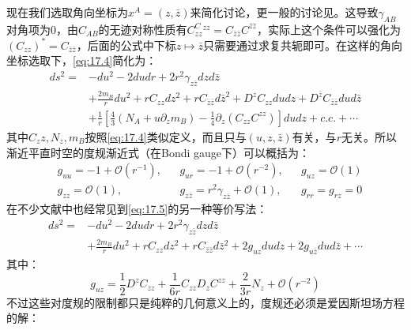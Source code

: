 现在我们选取角向坐标为$x^A=(z,\bar z)$来简化讨论，更一般的讨论见\cite{Compere:2019qed}。这导致$\gamma_{AB}$对角项为0，由$C_{AB}$的无迹对称性质有$C_{zz}^C^{zz}=C_{\bar z\bar z}C^{\bar z\bar z}$，实际上这个条件可以强化为$(C_{zz})^*=C_{\bar z\bar z}$，后面的公式中下标$z\mapsto \bar z$只需要通过求复共轭即可。在这样的角向坐标选取下，\ref{eq:17.4}简化为：
\begin{equation}\label{eq:17.5}
	\begin{aligned}
		ds^2=&-du^2-2dudr+2r^2\gamma_{z\bar z}dzd{\bar z}\\
		&+\frac{2m_B}{r}du^2+rC_{zz}dz^2+rC_{\bar z\bar z}d{\bar z}^2+D^z C_{zz}dudz+D^{\bar z}C_{\bar z\bar z}dud\bar z\\
		&+\frac{1}{r}\left[\frac{4}{3}\left(N_A+u\partial_zm_B\right)-\frac{1}{4}\partial_z\left(C_{zz}C^{zz}\right)\right]dudz+c.c.+\cdots
	\end{aligned}
\end{equation}
其中$C_zz,N_z,m_B$按照\ref{eq:17.4}类似定义，而且只与$(u,z,\bar z)$有关，与$r$无关。所以渐近平直时空的度规渐近式（在Bondi gauge下）可以概括为：
\begin{align*}
	&g_{uu}=-1+\mathcal{O}(r^{-1}),&&g_{ur}=-1+\mathcal{O}(r^{-2}),&&g_{uz}=\mathcal{O}(1)\\
	&g_{zz}=\mathcal{O}(1),&&g_{z\bar z}=r^2\gamma_{z\bar z}+\mathcal{O}(1),&&g_{rr}=g_{rz}=0
\end{align*}
在不少文献中\cite{Pasterski:2021rjz,Kapec:2014opa,Raclariu:2021zjz}也经常见到\ref{eq:17.5}的另一种等价写法：
\begin{equation}\label{eq:17.6}
	\begin{aligned}
		ds^2=&-du^2-2dudr+2r^2\gamma_{z\bar z}dzd{\bar z}\\
		&+\frac{2m_B}{r}du^2+rC_{zz}dz^2+rC_{\bar z\bar z}d{\bar z}^2+2g_{uz}dudz+2g_{u\bar z}dud\bar z+\cdots
	\end{aligned}
\end{equation}
其中：
\begin{equation}
	g_{uz}=\frac{1}{2}D^zC_{zz}+\frac{1}{6r}C_{zz}D_zC^{zz}+\frac{2}{3r}N_z+\mathcal{O}(r^{-2})
\end{equation}
不过这些对度规的限制都只是纯粹的几何意义上的，度规还必须是爱因斯坦场方程的解：
